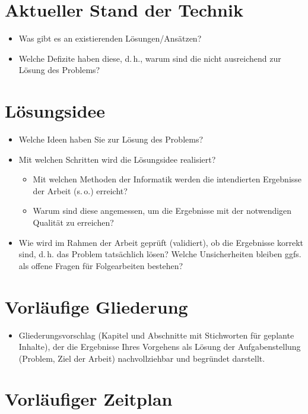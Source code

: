 \documentclass[12pt]{article} %
\begin{document}
\section{Aktueller Stand der Technik}

\begin{itemize}
\item Was gibt es an existierenden Lösungen/Ansätzen?
\item Welche Defizite haben diese, d.\,h., warum sind die nicht ausreichend
      zur Lösung des Problems?
\end{itemize}


\section{Lösungsidee}

\begin{itemize}
\item Welche Ideen haben Sie zur Lösung des Problems?
\item Mit welchen Schritten wird die Lösungsidee realisiert?
      \begin{itemize}
      \item Mit welchen Methoden der Informatik werden die intendierten
            Ergebnisse der Arbeit (s.\,o.) erreicht?
      \item Warum sind diese angemessen, um die Ergebnisse mit der notwendigen Qualität
            zu erreichen?
      \end{itemize}
      \item Wie wird im Rahmen der Arbeit geprüft (validiert), ob die Ergebnisse korrekt
            sind, d.\,h. das Problem tatsächlich lösen? Welche Unsicherheiten bleiben
            ggfs. als offene Fragen für Folgearbeiten bestehen?
\end{itemize}


\section{Vorläufige Gliederung}

\begin{itemize}
\item Gliederungsvorschlag (Kapitel und Abschnitte mit Stichworten für geplante Inhalte),
      der die Ergebnisse Ihres Vorgehens als Lösung der Aufgabenstellung
      (Problem, Ziel der Arbeit) nachvollziehbar und begründet darstellt.
\end{itemize}


\section{Vorläufiger Zeitplan}
\end{document}
